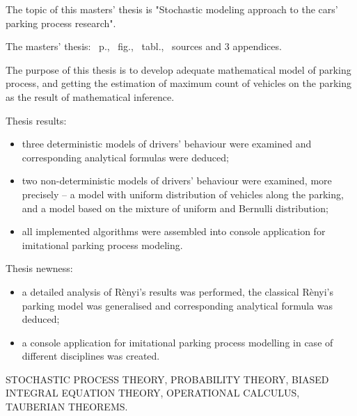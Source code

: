
The topic of this masters' thesis is "Stochastic modeling approach to the cars' parking process research".

The masters' thesis: \pageref*{MyLastPage}~p., \totfig~fig., \tottab~tabl., ~sources and 3 appendices.

The purpose of this thesis is to develop adequate mathematical model of parking process, and getting the estimation of maximum count of vehicles on the parking as the result of mathematical inference.

Thesis results:
\begin{itemize}
	\item three deterministic models of drivers' behaviour were examined and corresponding analytical formulas were deduced;
	\item two non-deterministic models of drivers' behaviour were examined, more precisely – a model with uniform distribution of vehicles along the parking, and a model based on the mixture of uniform and Bernulli distribution;
	\item all implemented algorithms were assembled into console application for imitational parking process modeling.
\end{itemize}

Thesis newness:
\begin{itemize}
	\item a detailed analysis of Rènyi's results was performed, the classical Rènyi's parking model was generalised and corresponding analytical formula was deduced;
	\item a console application for imitational parking process modelling in case of different disciplines was created.  
\end{itemize}

\MakeUppercase{stochastic process theory, probability theory, biased integral equation theory, operational calculus, tauberian theorems.}